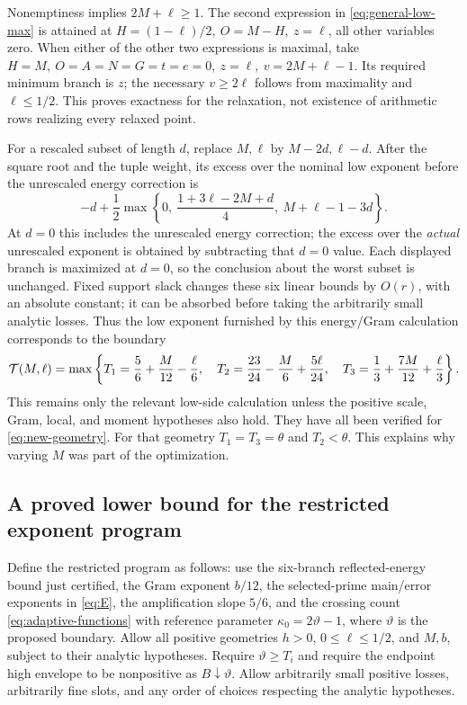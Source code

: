 \documentclass[12pt]{article}
\begin{document}
Nonemptiness implies \(2M+\ell\ge1\).
The second expression in \eqref{eq:general-low-max} is attained
at \(H=(1-\ell)/2,\ O=M-H,\ z=\ell\), all other variables zero.
When either of the other two expressions is maximal, take
\(H=M,\ O=A=N=G=t=e=0,\ z=\ell,\ v=2M+\ell-1\).
Its required minimum branch is \(z\); the necessary \(v\ge2\ell\)
follows from maximality and \(\ell\le1/2\).
This proves exactness for the relaxation, not existence of arithmetic
rows realizing every relaxed point.

For a rescaled subset of length \(d\), replace \(M,\ell\) by
\(M-2d,\ell-d\).
After the square root and the tuple weight, its excess over the
nominal low exponent before the unrescaled energy correction is
\[
 -d+\frac12\max\left\{0,\
              \frac{1+3\ell-2M+d}{4},\
              M+\ell-1-3d\right\}.
\]
At \(d=0\) this includes the unrescaled energy correction;
the excess over the \emph{actual} unrescaled exponent is obtained
by subtracting that \(d=0\) value.  Each displayed branch is
maximized at \(d=0\), so the conclusion about the worst subset is
unchanged.
Fixed support slack changes these six linear bounds by \(O(r)\),
with an absolute constant; it can be absorbed before taking the
arbitrarily small analytic losses.
Thus the low exponent furnished by this energy/Gram calculation
corresponds to the boundary
\begin{equation}\label{eq:three-low-planes}
 {\cal T}(M,\ell)=
 \max\left\{
 T_1=\frac56+\frac M{12}-\frac\ell6,\quad
 T_2=\frac{23}{24}-\frac M6+\frac{5\ell}{24},\quad
 T_3=\frac13+\frac{7M}{12}+\frac\ell3
 \right\}.
\end{equation}
This remains only the relevant low-side calculation unless the
positive scale, Gram, local, and moment hypotheses also hold.
They have all been verified for \eqref{eq:new-geometry}.
For that geometry \(T_1=T_3=\theta\) and \(T_2<\theta\).
This explains why varying \(M\) was part of the optimization.

\subsection{A proved lower bound for the restricted exponent program}
Define the restricted program as follows: use the six-branch
reflected-energy bound just certified, the Gram exponent \(b/12\),
the selected-prime main/error exponents in \eqref{eq:E}, the
amplification slope \(5/6\), and the crossing count
\eqref{eq:adaptive-functions} with reference parameter
\(\kappa_0=2\vartheta-1\), where \(\vartheta\) is the proposed
boundary.  Allow all positive geometries \(h>0\),
\(0\le\ell\le1/2\), and \(M,b\), subject to their analytic
hypotheses.  Require \(\vartheta\ge T_i\) and require the
endpoint high envelope to be nonpositive as \(B\downarrow\vartheta\).
Allow arbitrarily small positive losses, arbitrarily fine slots,
and any order of choices respecting the analytic hypotheses.
\end{document}
